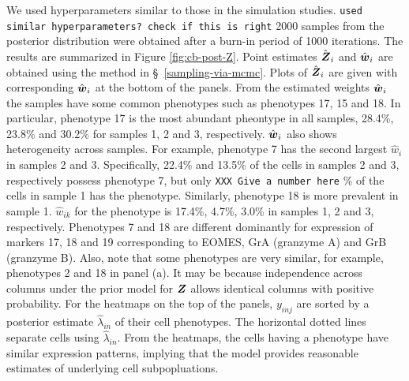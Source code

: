 \documentclass[12pt,]{article}
\newcommand{\bZ}{\mbox{\boldmath $Z$}}
\newcommand{\bw}{\mbox{\boldmath $w$}}
\begin{document}
We used hyperparameters similar to those in the simulation studies.
{\tt used similar hyperparameters?  check if this is right}
%
2000 samples from the posterior distribution were obtained after a burn-in period of 1000 iterations. The results are summarized in Figure
\ref{fig:cb-post-Z}.  Point estimates $\hat{\bZ}_i$ and $\hat{\bw}_i$ are obtained using the method in \S~\ref{sampling-via-mcmc}. %
Plots of $\hat{\bZ}_i$ are given with corresponding $\hat{\bw}_i$ at the bottom
of the panels.  From the estimated weights $\hat{\bw}_i$ the samples have some
common phenotypes such as phenotypes 17, 15 and 18.  In particular, phenotype
17 is the most abundant pheontype in all samples, 28.4\%, 23.8\% and 30.2\% for
samples 1, 2 and 3, respectively.  $\hat{\bw}_i$ also shows heterogeneity
across samples.  For example, phenotype 7 has the second largest $\hat{w}_i$ in
samples 2 and 3. Specifically, 22.4\% and 13.5\% of the cells in samples 2 and
3, respectively possess phenotype 7, but only
{\tt XXX  Give a number here} \%
%
of the cells in sample 1 has the phenotype.  Similarly, phenotype 18 is more
prevalent in sample 1.  $\hat{w}_{ik}$ for the phenotype is 17.4\%, 4.7\%,
3.0\% in samples 1, 2 and 3, respectively.  Phenotypes 7 and 18 are different
dominantly for expression of markers 17, 18 and 19 corresponding to EOMES, GrA
(granzyme A) and GrB (granzyme B).  Also, note that some phenotypes are very
similar, for example, phenotypes 2 and 18 in panel (a).  It may be because
independence across columns under the prior model for $\bZ$ allows identical
columns with positive probability.  For the heatmaps on the top of the panels,
$y_{inj}$ are sorted by a posterior estimate $\hat{\lambda}_{in}$ of their cell
phenotypes. The horizontal dotted lines separate cells using
$\hat{\lambda}_{in}$.  From the heatmaps, the cells having a phenotype have
similar expression patterns, implying that the model provides reasonable
estimates of underlying cell subpopluations.

\end{document}
